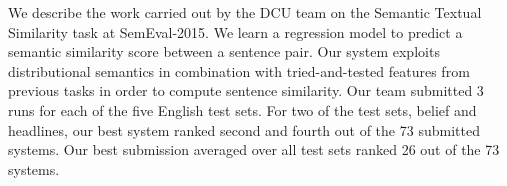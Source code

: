 We describe the work carried out by the DCU team on the Semantic Textual Similarity task at SemEval-2015. We learn a regression model to predict a semantic similarity score between a sentence pair. Our system exploits distributional semantics in combination with tried-and-tested features from previous tasks in order to compute sentence similarity. Our team submitted 3 runs for each of the five English test sets. For two of the test sets, belief and headlines, our best system ranked second and fourth out of the 73 submitted systems. Our best submission averaged over all test sets ranked 26 out of the 73 systems.
